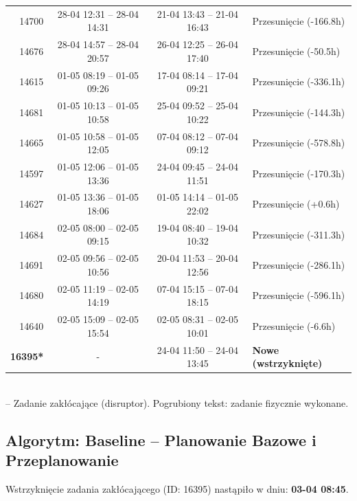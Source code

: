 \begin{table}[htbp]
\begin{tabular}{|r|c|c|l|}
14700 & 28-04 12:31 -- 28-04 14:31 & 21-04 13:43 -- 21-04 16:43 & Przesunięcie (-166.8h) \\ 
14676 & 28-04 14:57 -- 28-04 20:57 & 26-04 12:25 -- 26-04 17:40 & Przesunięcie (-50.5h) \\ 
14615 & 01-05 08:19 -- 01-05 09:26 & 17-04 08:14 -- 17-04 09:21 & Przesunięcie (-336.1h) \\ 
14681 & 01-05 10:13 -- 01-05 10:58 & 25-04 09:52 -- 25-04 10:22 & Przesunięcie (-144.3h) \\ 
14665 & 01-05 10:58 -- 01-05 12:05 & 07-04 08:12 -- 07-04 09:12 & Przesunięcie (-578.8h) \\ 
14597 & 01-05 12:06 -- 01-05 13:36 & 24-04 09:45 -- 24-04 11:51 & Przesunięcie (-170.3h) \\ 
14627 & 01-05 13:36 -- 01-05 18:06 & 01-05 14:14 -- 01-05 22:02 & Przesunięcie (+0.6h) \\ 
14684 & 02-05 08:00 -- 02-05 09:15 & 19-04 08:40 -- 19-04 10:32 & Przesunięcie (-311.3h) \\ 
14691 & 02-05 09:56 -- 02-05 10:56 & 20-04 11:53 -- 20-04 12:56 & Przesunięcie (-286.1h) \\ 
14680 & 02-05 11:19 -- 02-05 14:19 & 07-04 15:15 -- 07-04 18:15 & Przesunięcie (-596.1h) \\ 
14640 & 02-05 15:09 -- 02-05 15:54 & 02-05 08:31 -- 02-05 10:01 & Przesunięcie (-6.6h) \\ 
\hline
\textbf{16395*} & - & 24-04 11:50 -- 24-04 13:45 & \textbf{Nowe (wstrzyknięte)} \\ 
\hline
\end{tabular}
\\ {\footnotesize * -- Zadanie zakłócające (disruptor). Pogrubiony tekst: zadanie fizycznie wykonane.}
\end{table}

\vspace{0.8cm}
\subsection{Algorytm: Baseline -- Planowanie Bazowe i Przeplanowanie}

Wstrzyknięcie zadania zakłócającego (ID: 16395) nastąpiło w dniu: \textbf{03-04 08:45}.

